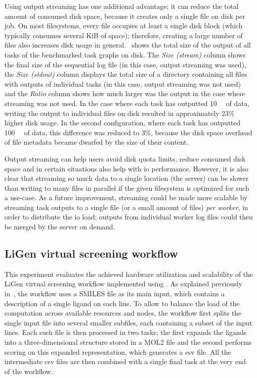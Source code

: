 Using output streaming has one additional advantage; it can reduce the total amount of consumed
disk space, because it creates only a single file on disk per job. On most filesystems, every file
occupies at least a single disk block (which typically consumes several KiB of space); therefore,
creating a large number of files also increases disk usage in general.~
shows the total size of the output of all tasks of the benchmarked task graphs on disk. The
\emph{Size (stream)} column shows the final size of the sequential log file (in this case,
output streaming was used), the \emph{Size (stdout)} column displays the total size of a
directory containing all files with outputs of individual tasks (in this case, output streaming was
not used) and the \emph{Ratio} column shows how much larger was the output in the case
where streaming was not used. In the case where each task has outputted \SI{10}{\kibi\byte} of
data, writing the output to individual files on disk resulted in approximately
$23\%$ higher disk usage. In the second configuration, where each task has
outputted \SI{100}{\kibi\byte} of data, this difference was reduced to $3\%$,
because the disk space overhead of file metadata became dwarfed by the size of their content.

Output streaming can help users avoid disk quota limits, reduce consumed disk space and in certain
situations also help with \gls{io} performance. However, it is also clear that
streaming so much data to a single location (the server) can be slower than writing to many files
in parallel if the given filesystem is optimized for such a use-case. As a future improvement,
streaming could be made more scalable by streaming task outputs to a single file (or a small amount
of files) \emph{per worker}, in order to distribute the \gls{io} load; outputs
from individual worker log files could then be merged by the server on demand.

\subsection{LiGen virtual screening workflow}
\label{sec:hq-exp-ligen}
This experiment evaluates the achieved hardware utilization and scalability of the LiGen virtual
screening workflow implemented using \hyperqueue{}. As explained previously
in~, the workflow uses a SMILES file as its main input, which contains a
description of a single ligand on each line. To allow \hyperqueue{} to balance the load
of the computation across available resources and nodes, the workflow first splits the single input
file into several smaller subfiles, each containing a subset of the input lines. Each such file is
then processed in two tasks; the first expands the ligands into a three-dimensional structure
stored in a MOL2 file and the second performs scoring on this expanded representation, which
generates a \gls{csv} file. All the intermediate \gls{csv} files are
then combined with a single final task at the very end of the workflow.

